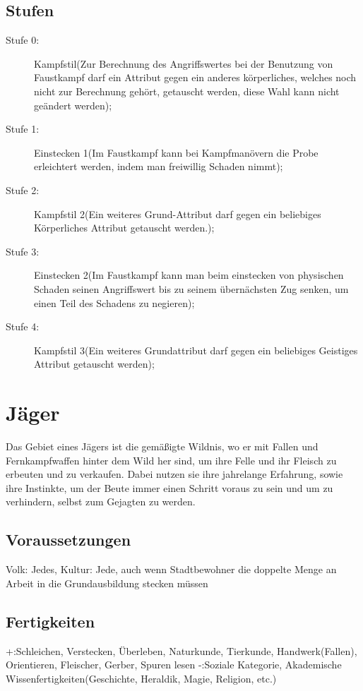 \documentclass[a4paper,12pt,oneside]{book}
\begin{document}
\subsection{Stufen}
\begin{description}
\item[Stufe 0:]Kampfstil(Zur Berechnung des Angriffswertes bei der Benutzung von Faustkampf darf ein Attribut gegen ein anderes körperliches, welches noch nicht zur Berechnung gehört, getauscht werden, diese Wahl kann nicht geändert werden); 
\item[Stufe 1:]Einstecken 1(Im Faustkampf kann bei Kampfmanövern die Probe erleichtert werden, indem man freiwillig Schaden nimmt);
\item[Stufe 2:]Kampfstil 2(Ein weiteres Grund-Attribut darf gegen ein beliebiges Körperliches Attribut getauscht werden.);
\item[Stufe 3:]Einstecken 2(Im Faustkampf kann man beim einstecken von physischen Schaden seinen Angriffswert bis zu seinem übernächsten Zug senken, um einen Teil des Schadens zu negieren);
\item[Stufe 4:]Kampfstil 3(Ein weiteres Grundattribut darf gegen ein beliebiges Geistiges Attribut getauscht werden);
\end{description}

\section{Jäger}
Das Gebiet eines Jägers ist die gemäßigte Wildnis, wo er mit Fallen und Fernkampfwaffen hinter dem Wild her sind, um ihre Felle und ihr Fleisch zu erbeuten und zu verkaufen. Dabei nutzen sie ihre jahrelange Erfahrung, sowie ihre Instinkte, um der Beute immer einen Schritt voraus zu sein und um zu verhindern, selbst zum Gejagten zu werden.
\subsection{Voraussetzungen}
Volk: Jedes, Kultur: Jede, auch wenn Stadtbewohner die doppelte Menge an Arbeit in die Grundausbildung stecken müssen
\subsection{Fertigkeiten}
+:Schleichen, Verstecken, Überleben, Naturkunde, Tierkunde, Handwerk(Fallen), Orientieren, Fleischer, Gerber, Spuren lesen
-:Soziale Kategorie, Akademische Wissenfertigkeiten(Geschichte, Heraldik, Magie, Religion, etc.)
\end{document}
